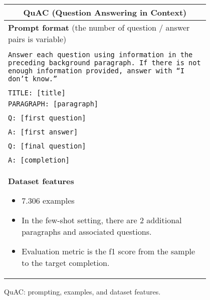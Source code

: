\begin{figure}[p]
    \centering
    \small
    \begin{tabular}{p{0.95\linewidth}}
    \toprule
    \multicolumn{1}{c}{\textbf{QuAC (Question Answering in Context)}} \\
    \midrule
    \textbf{Prompt format} {(the number of question / answer pairs is variable)}\\\\
    \texttt{Answer each question using information in the preceding background paragraph. If there is not enough information provided, answer with ``I don't know.''}\\\\
    \texttt{TITLE: [title]} \\
    \texttt{PARAGRAPH: [paragraph]} \\\\
    \texttt{Q: [first question]} \\\\
    \texttt{A: [first answer]} \\\\
    \texttt{Q: [final question]} \\\\
    \texttt{A: [completion]} \\

    \midrule
    \textbf{Dataset features}
    \begin{itemize}
        \item 7.306 examples
        \item In the few-shot setting, there are 2 additional paragraphs and associated questions.
        \item Evaluation metric is the f1 score from the sample to the target completion.
    \end{itemize} \\

    \bottomrule
    \end{tabular}
    \caption{QuAC: prompting, examples, and dataset features.}
    \label{tab:prompt-quac}
\end{figure}

